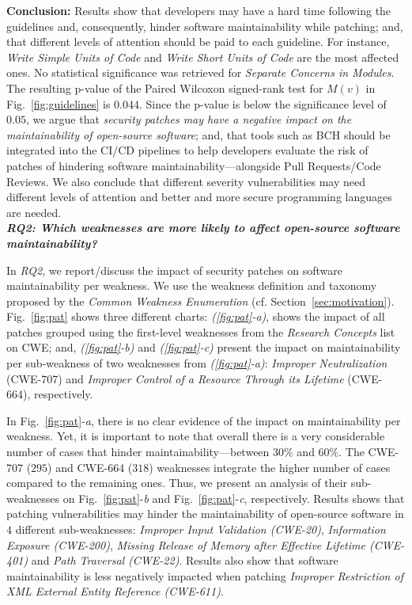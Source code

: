 \documentclass[smallextended]{svjour3}       %
\begin{document}
\textbf{Conclusion:} Results show that developers may have a hard time following the 
guidelines and, consequently, hinder software maintainability while patching; and, 
that different levels of attention should be paid to each guideline. For instance,
\emph{Write Simple Units of Code} and \emph{Write Short Units of Code}
are the most affected ones. No statistical significance was retrieved
for \emph{Separate Concerns in Modules}. 
The resulting p-value of the Paired Wilcoxon signed-rank test for $M(v)$ in Fig.~\ref{fig:guidelines}
is $0.044$. Since the p-value is 
below the significance level of $0.05$, we argue that \emph{security patches 
may have a negative impact on the maintainability of open-source software}; and, 
that tools such as BCH should be integrated into the CI/CD pipelines
to help developers evaluate the risk of patches of hindering software maintainability---alongside Pull Requests/Code Reviews. We also conclude that different severity 
vulnerabilities may need different levels of attention and better and more secure 
programming languages are needed.
%
\\\textit{\textbf{RQ2: Which weaknesses are more likely to
affect open-source software maintainability?}}

In \emph{RQ2}, we report/discuss the impact of security patches on
software maintainability per weakness. We use the weakness definition
and taxonomy proposed by the \emph{Common Weakness Enumeration} (cf. Section~\ref{sec:motivation}).
Fig.~\ref{fig:pat} shows three different charts: \emph{(\ref{fig:pat}-a)}, shows
the impact of all patches grouped using the first-level weaknesses from
the \emph{Research Concepts} list on CWE; and, \emph{(\ref{fig:pat}-b)} and  
\emph{(\ref{fig:pat}-c)} present the impact on maintainability per sub-weakness of two 
weaknesses from \emph{(\ref{fig:pat}-a)}: \emph{Improper Neutralization} (CWE-707) and 
\emph{Improper Control of a Resource 
Through its Lifetime} (CWE-664), respectively.

In Fig.~\ref{fig:pat}-\emph{a}, there is no clear evidence of the impact on 
maintainability per weakness. Yet, it is important to note that
overall there is a very considerable number of cases that hinder
maintainability---between $30\%$ and $60\%$.
The CWE-707 ($295$) and CWE-664 ($318$) 
weaknesses integrate the higher number of cases compared to the remaining 
ones. Thus, we present an analysis of their sub-weaknesses on 
Fig.~\ref{fig:pat}-\emph{b} and Fig.~\ref{fig:pat}-\emph{c}, respectively. 
Results shows that patching vulnerabilities may hinder 
the maintainability of open-source software in $4$ different sub-weaknesses: 
\emph{Improper Input Validation (CWE-20)}, \emph{Information Exposure 
(CWE-200)}, \emph{Missing Release of Memory after Effective 
Lifetime (CWE-401)} and \emph{Path Traversal (CWE-22)}. Results also show that 
software maintainability is less negatively impacted when patching 
\emph{Improper Restriction of XML External Entity Reference (CWE-611)}.  
\end{document}
